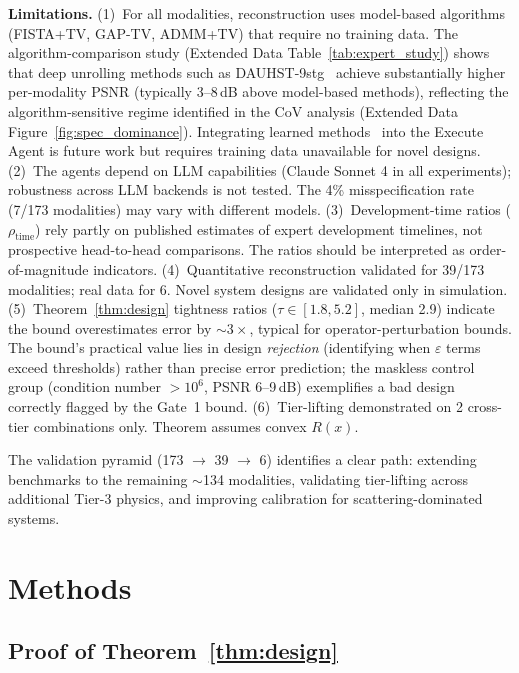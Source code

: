 \documentclass[11pt,a4paper]{article}
\newcommand{\eps}{\varepsilon}
\begin{document}
\textbf{Limitations.}
(1)~For all modalities, reconstruction uses model-based algorithms (FISTA+TV, GAP-TV, ADMM+TV) that require no training data.  The algorithm-comparison study (Extended Data Table~\ref{tab:expert_study}) shows that deep unrolling methods such as DAUHST-9stg~\cite{cai2022dauhst} achieve substantially higher per-modality PSNR (typically 3--8\,dB above model-based methods), reflecting the algorithm-sensitive regime identified in the CoV analysis (Extended Data Figure~\ref{fig:spec_dominance}).  Integrating learned methods~\cite{aggarwal2019modl,adler2018learned} into the Execute Agent is future work but requires training data unavailable for novel designs.
(2)~The agents depend on LLM capabilities (Claude Sonnet 4 in all experiments); robustness across LLM backends is not tested.  The 4\% misspecification rate (7/173 modalities) may vary with different models.
(3)~Development-time ratios ($\rho_{\text{time}}$) rely partly on published estimates of expert development timelines, not prospective head-to-head comparisons.  The ratios should be interpreted as order-of-magnitude indicators.
(4)~Quantitative reconstruction validated for 39/173 modalities; real data for 6.  Novel system designs are validated only in simulation.
(5)~Theorem~\ref{thm:design} tightness ratios ($\tau \in [1.8, 5.2]$, median 2.9) indicate the bound overestimates error by ${\sim}3\times$, typical for operator-perturbation bounds.  The bound's practical value lies in design \emph{rejection} (identifying when $\eps$ terms exceed thresholds) rather than precise error prediction; the maskless control group (condition number $>10^6$, PSNR 6--9\,dB) exemplifies a bad design correctly flagged by the Gate~1 bound.
(6)~Tier-lifting demonstrated on 2 cross-tier combinations only.  Theorem assumes convex $R(x)$.

The validation pyramid (173 $\to$ 39 $\to$ 6) identifies a clear path: extending benchmarks to the remaining ${\sim}$134 modalities, validating tier-lifting across additional Tier-3 physics, and improving calibration for scattering-dominated systems.

\section{Methods}

\subsection{Proof of Theorem~\ref{thm:design}}
\end{document}
